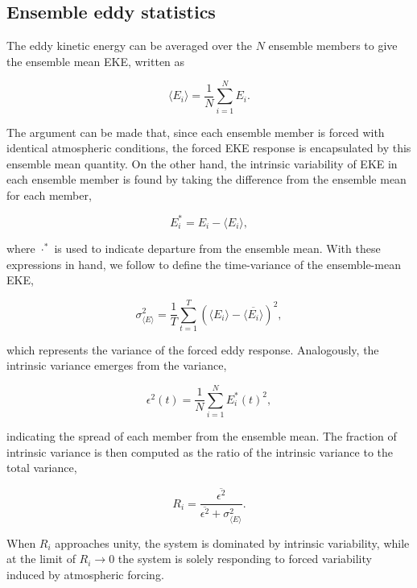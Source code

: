 \documentclass[linenumbers]{agujournal2019}
\begin{document}
\subsection{Ensemble eddy statistics}

The eddy kinetic energy can be averaged over the $N$ ensemble members to give the ensemble mean EKE, written as
\begin{linenomath*}
\begin{equation}
\langle E_i \rangle = \frac{1}{N} \sum_{i=1}^N E_i.
\end{equation}
\end{linenomath*}
The argument can be made that, since each ensemble member is forced with identical atmospheric conditions, the forced EKE response is encapsulated by this ensemble mean quantity.
On the other hand, the intrinsic variability of EKE in each ensemble member is found by taking the difference from the ensemble mean for each member,
\begin{linenomath*}
\begin{equation}
E_i^* = E_i - \langle E_i \rangle,
\end{equation}
\end{linenomath*}
where $\cdot^*$ is used to indicate departure from the ensemble mean.
With these expressions in hand, we follow \citet{Leroux2018} to define the  time-variance of the ensemble-mean EKE,
\begin{linenomath*}
\begin{equation}
\sigma^2_{\langle E \rangle} = \frac{1}{T} \sum_{t=1}^T \left(\langle E_i \rangle -  \overline{\langle E_i \rangle}\right)^2,
\end{equation}
\end{linenomath*}
which represents the variance of the forced eddy response.
Analogously, the intrinsic variance emerges from the variance,
\begin{linenomath*}
\begin{equation}
\epsilon^2(t) = \frac{1}{N} \sum_{i=1}^N E_i^*(t)^2,
\end{equation}
\end{linenomath*}
indicating the spread of each member from the ensemble mean.
The fraction of intrinsic variance is then computed as the ratio of the intrinsic variance to the total variance,
\begin{linenomath*}
\begin{equation}
R_i =  \frac{\overline{\epsilon^2}}{\overline{\epsilon^2} + \sigma^2_{\langle E \rangle}}.
\end{equation}
\end{linenomath*}
When $R_i$ approaches unity, the system is dominated by intrinsic variability, while at the limit  of $R_i \to 0$ the system is solely responding to forced variability induced by atmospheric forcing.
\end{document}
